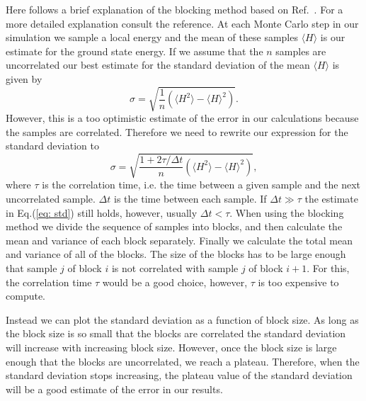 \documentclass[../main.tex]{subfiles}
\begin{document}
Here follows a brief explanation of the blocking method based on Ref.~\cite{FYS4411-Slides}. For a more detailed explanation consult the reference.
At each Monte Carlo step in our simulation we sample a local energy and the mean of these samples $\langle H\rangle$ is our estimate for the ground state energy. If we assume that the $n$ samples are uncorrelated our best estimate for the standard deviation of the mean $\langle H\rangle$ is given by
\begin{equation}\label{eq: std}
    \sigma = \sqrt{\frac{1}{n}(\langle H^2\rangle - \langle H\rangle^2)}.
\end{equation}
However, this is a too optimistic estimate of the error in our calculations because the samples are correlated. Therefore we need to rewrite our expression for the standard deviation to
\begin{equation}
    \sigma = \sqrt{\frac{1+2\tau/\Delta t}{n}(\langle H^2\rangle - \langle H\rangle^2)},
\end{equation}
where $\tau$ is the correlation time, i.e. the time between a given sample and the next uncorrelated sample. $\Delta t$ is the time between each sample. If $\Delta t \gg \tau$ the estimate in Eq.(\ref{eq: std}) still holds, however, usually $\Delta t < \tau$. When using the blocking method we divide the sequence of samples into blocks, and then calculate the mean and variance of each block separately. Finally we calculate the total mean and variance of all of the blocks. The size of the blocks has to be large enough that sample $j$ of block $i$ is not correlated with sample $j$ of block $i+1$. For this, the correlation time $\tau$ would be a good choice, however, $\tau$ is too expensive to compute. 

Instead we can plot the standard deviation as a function of block size. As long as the block size is so small that the blocks are correlated the standard deviation will increase with increasing block size. However, once the block size is large enough that the blocks are uncorrelated, we reach a plateau. Therefore, when the standard deviation stops increasing, the plateau value of the standard deviation will be a good estimate of the error in our results.
\end{document}
